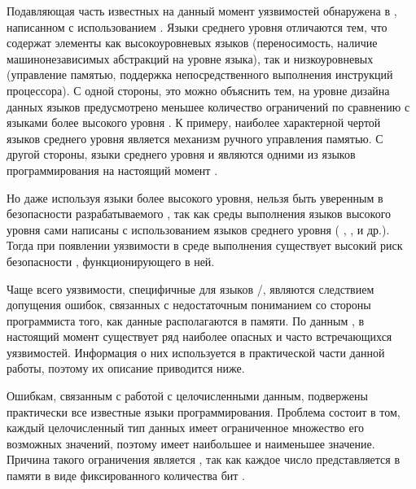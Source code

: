 %
Подавляющая часть известных на данный момент уязвимостей обнаружена в , написанном с использованием    . 
%
Языки среднего уровня отличаются тем, что содержат элементы как высокоуровневых языков (переносимость, наличие машинонезависимых абстракций на уровне языка), так и низкоуровневых (управление памятью, поддержка непосредственного выполнения инструкций процессора). 
%
С одной стороны, это можно объяснить тем, на уровне дизайна данных языков предусмотрено меньшее количество ограничений по сравнению с языками более высокого уровня . 
%
К примеру, наиболее характерной чертой языков среднего уровня является механизм ручного управления памятью. 
%
С другой стороны, языки среднего уровня   и   являются одними из  языков программирования на настоящий момент .

%
Но даже используя языки более высокого уровня, нельзя быть уверенным в безопасности разрабатываемого , так как среды выполнения языков высокого уровня сами написаны с использованием языков среднего уровня ( ,  ,   и др.). 
%
Тогда при появлении уязвимости в среде выполнения существует высокий риск безопасности , функционирующего в ней.

%
Чаще всего уязвимости, специфичные для языков /, являются следствием допущения ошибок, связанных с недостаточным пониманием со стороны программиста того, как данные располагаются в памяти.
%
По данным  , в настоящий момент существует ряд наиболее опасных и часто встречающихся уязвимостей. 
%
Информация о них используется в практической части данной работы, поэтому их описание приводится ниже. 



%
Ошибкам, связанным с работой с целочисленными данным, подвержены практически все известные языки программирования. 
%
Проблема состоит в том, каждый целочисленный тип данных имеет ограниченное множество его возможных значений, поэтому имеет наибольшее и наименьшее значение. 
%
Причина такого ограничения является , так как каждое число представляется в памяти в виде фиксированного количества бит .

